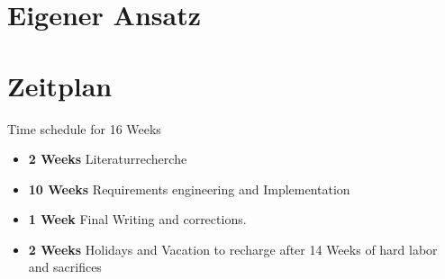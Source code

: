 \documentclass{article}
\begin{document}
\section{Eigener Ansatz}
\section{Zeitplan}
Time schedule for 16 Weeks
\begin{itemize}
    \item \textbf{2 Weeks} Literaturrecherche    
    \item \textbf{10 Weeks} Requirements engineering and Implementation
    \item \textbf{1 Week} Final Writing and corrections.
    \item \textbf{2 Weeks} Holidays and Vacation to recharge after 14 Weeks of hard labor and sacrifices
\end{itemize}

\pagebreak
\nocite{*}

 
\end{document}
